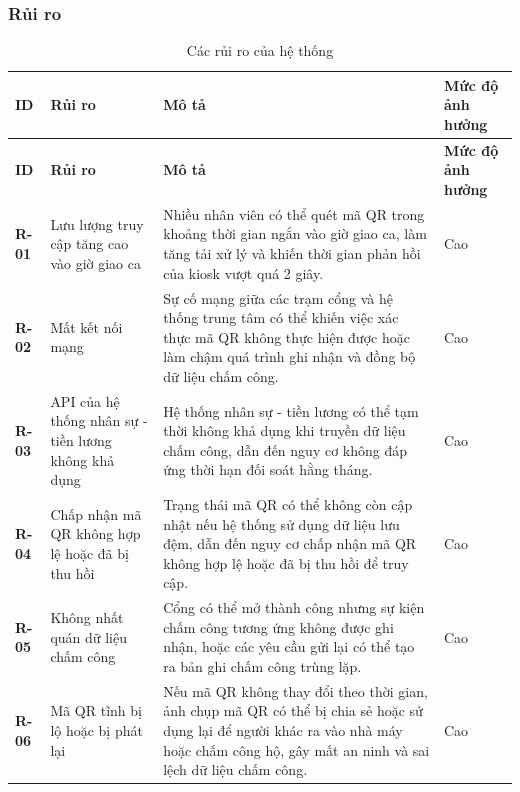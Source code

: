 \subsubsection{Rủi ro}
\begingroup
\small
\renewcommand{\arraystretch}{1.2}
\begin{longtable}{|>{\centering\arraybackslash}m{1.3cm}|>{\raggedright\arraybackslash}m{3.8cm}|>{\raggedright\arraybackslash}m{8.5cm}|>{\centering\arraybackslash}m{1.8cm}|}
    \caption{Các rủi ro của hệ thống}\label{tab:system-risks}\\
    \hline
    \textbf{ID} & \textbf{Rủi ro} & \textbf{Mô tả} & \textbf{Mức độ ảnh hưởng}\\
    \hline
    \endfirsthead
    \hline
    \textbf{ID} & \textbf{Rủi ro} & \textbf{Mô tả} & \textbf{Mức độ ảnh hưởng}\\
    \hline
    \endhead
    \hline
    \endfoot
    \hline
    \endlastfoot
    \textbf{R-01} & Lưu lượng truy cập tăng cao vào giờ giao ca & Nhiều nhân viên có thể quét mã QR trong khoảng thời gian ngắn vào giờ giao ca, làm tăng tải xử lý và khiến thời gian phản hồi của kiosk vượt quá 2 giây. & Cao\\
    \hline
    \textbf{R-02} & Mất kết nối mạng & Sự cố mạng giữa các trạm cổng và hệ thống trung tâm có thể khiến việc xác thực mã QR không thực hiện được hoặc làm chậm quá trình ghi nhận và đồng bộ dữ liệu chấm công. & Cao\\
    \hline
    \textbf{R-03} & API của hệ thống nhân sự - tiền lương không khả dụng & Hệ thống nhân sự - tiền lương có thể tạm thời không khả dụng khi truyền dữ liệu chấm công, dẫn đến nguy cơ không đáp ứng thời hạn đối soát hằng tháng. & Cao\\
    \hline
    \textbf{R-04} & Chấp nhận mã QR không hợp lệ hoặc đã bị thu hồi & Trạng thái mã QR có thể không còn cập nhật nếu hệ thống sử dụng dữ liệu lưu đệm, dẫn đến nguy cơ chấp nhận mã QR không hợp lệ hoặc đã bị thu hồi để truy cập. & Cao\\
    \hline
    \textbf{R-05} & Không nhất quán dữ liệu chấm công & Cổng có thể mở thành công nhưng sự kiện chấm công tương ứng không được ghi nhận, hoặc các yêu cầu gửi lại có thể tạo ra bản ghi chấm công trùng lặp. & Cao\\
    \hline
    \textbf{R-06} & Mã QR tĩnh bị lộ hoặc bị phát lại & Nếu mã QR không thay đổi theo thời gian, ảnh chụp mã QR có thể bị chia sẻ hoặc sử dụng lại để người khác ra vào nhà máy hoặc chấm công hộ, gây mất an ninh và sai lệch dữ liệu chấm công. & Cao\\
    \hline
\end{longtable}
\endgroup


